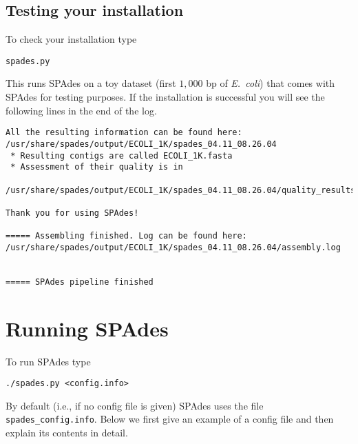 \documentclass{article}
\def\spades{SPAdes}
\def\ecoli{\it E.~coli}
\begin{document}
\subsection{Testing your installation}
To check your installation type
\begin{lstlisting}
spades.py
\end{lstlisting}
This runs {\spades} on a toy dataset (first $1{,}000$ bp of {\ecoli}) that comes with {\spades} for testing purposes.
If the installation is successful you will see the following lines in the end of the log.
\begin{lstlisting}
All the resulting information can be found here:
/usr/share/spades/output/ECOLI_1K/spades_04.11_08.26.04
 * Resulting contigs are called ECOLI_1K.fasta
 * Assessment of their quality is in
  /usr/share/spades/output/ECOLI_1K/spades_04.11_08.26.04/quality_results/

Thank you for using SPAdes!

===== Assembling finished. Log can be found here:
/usr/share/spades/output/ECOLI_1K/spades_04.11_08.26.04/assembly.log


===== SPAdes pipeline finished
\end{lstlisting}



\section{Running {\spades}}\label{sec:running}
To run {\spades} type
\begin{lstlisting}
./spades.py <config.info>
\end{lstlisting}
By default (i.e., if no config file is given) {\spades} uses the file {\tt spades\_config.info}. 
Below we first give an example of a config file
and then explain its contents in detail.
\end{document}
